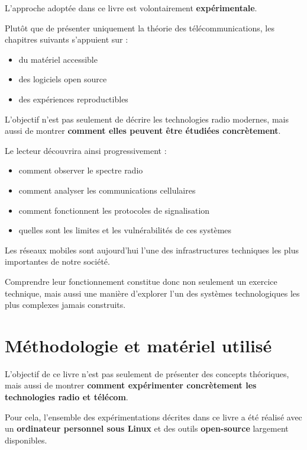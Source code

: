 \documentclass[
  french,
]{article}
\providecommand{\tightlist}{%
  \setlength{\itemsep}{0pt}\setlength{\parskip}{0pt}}
\begin{document}
L'approche adoptée dans ce livre est volontairement
\textbf{expérimentale}.

Plutôt que de présenter uniquement la théorie des télécommunications,
les chapitres suivants s'appuient sur :

\begin{itemize}
\tightlist
\item
  du matériel accessible
\item
  des logiciels open source
\item
  des expériences reproductibles
\end{itemize}

L'objectif n'est pas seulement de décrire les technologies radio
modernes, mais aussi de montrer \textbf{comment elles peuvent être
étudiées concrètement}.

Le lecteur découvrira ainsi progressivement :

\begin{itemize}
\tightlist
\item
  comment observer le spectre radio
\item
  comment analyser les communications cellulaires
\item
  comment fonctionnent les protocoles de signalisation
\item
  quelles sont les limites et les vulnérabilités de ces systèmes
\end{itemize}

Les réseaux mobiles sont aujourd'hui l'une des infrastructures
techniques les plus importantes de notre société.

Comprendre leur fonctionnement constitue donc non seulement un exercice
technique, mais aussi une manière d'explorer l'un des systèmes
technologiques les plus complexes jamais construits.

\section{Méthodologie et matériel
utilisé}\label{muxe9thodologie-et-matuxe9riel-utilisuxe9}

L'objectif de ce livre n'est pas seulement de présenter des concepts
théoriques, mais aussi de montrer \textbf{comment expérimenter
concrètement les technologies radio et télécom}.

Pour cela, l'ensemble des expérimentations décrites dans ce livre a été
réalisé avec un \textbf{ordinateur personnel sous Linux} et des outils
\textbf{open-source} largement disponibles.
\end{document}
